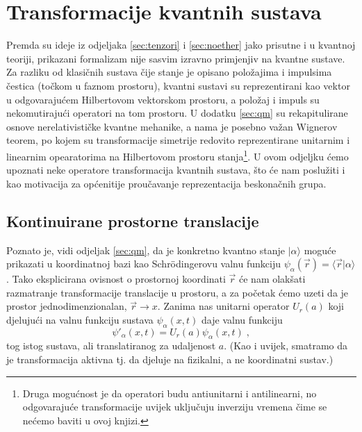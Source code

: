 \section{Transformacije kvantnih sustava}
\label{sec:qmtrans}

Premda su ideje iz odjeljaka \ref{sec:tenzori} i \ref{sec:noether}
jako prisutne i u kvantnoj teoriji, prikazani formalizam nije sasvim
izravno primjenjiv na kvantne sustave. Za razliku od klasičnih sustava
čije stanje je opisano položajima i impulsima čestica (točkom u faznom
prostoru), kvantni sustavi su reprezentirani kao vektor
u odgovarajućem Hilbertovom vektorskom prostoru, a položaj i impuls
su nekomutirajući operatori na tom prostoru. U dodatku \ref{sec:qm}
su rekapitulirane osnove nerelativističke kvantne mehanike, a
nama je posebno važan Wignerov teorem, po kojem su transformacije simetrije
redovito reprezentirane unitarnim i linearnim opearatorima na
Hilbertovom prostoru stanja\footnote{Druga mogućnost je da operatori
    budu antiunitarni i antilinearni, no odgovarajuće transformacije
    uvijek uključuju inverziju vremena čime se nećemo baviti u ovoj knjizi.}.
U ovom odjeljku ćemo upoznati neke operatore transformacija kvantnih
sustava, što će nam poslužiti i kao motivacija za općenitije
proučavanje reprezentacija beskonačnih grupa.

\subsection{Kontinuirane prostorne translacije}
\label{sec:prostornetranslacije}

Poznato je, vidi odjeljak \ref{sec:qm}, da je konkretno kvantno stanje
$|\alpha\rangle$ moguće prikazati u koordinatnoj bazi kao Schr\"{o}dingerovu
valnu funkciju $\psi_{\alpha}(\vec{r}) = \langle \vec{r} | \alpha\rangle$.
Tako eksplicirana ovisnost o prostornoj koordinati $\vec{r}$ će nam
olakšati razmatranje transformacije translacije u prostoru, a za početak
ćemo uzeti da je prostor jednodimenzionalan, $\vec{r} \to x$.
Zanima nas unitarni operator $U_{r}(a)$ koji djelujući na valnu
funkciju sustava $\psi_{\alpha}(x, t)$ daje valnu funkciju 
\begin{equation}
  \psi'_{\alpha}(x,t)= U_{r}(a)\psi_{\alpha}(x,t) \;,
\end{equation}
tog istog sustava, ali translatiranog za udaljenost $a$. (Kao i uvijek,
smatramo da je transformacija aktivna tj. da djeluje na fizikalni,
a ne koordinatni sustav.)

